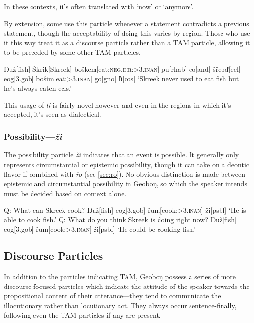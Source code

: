 \documentclass[10pt]{article}
\newcommand{\sk}{\textsc}
\newcommand{\vd}{ď}
\newcommand{\vz}{ž}
\newcommand{\vs}{š}
\newcommand{\vr}{ř}
\newcommand{\vl}{ľ}
\newcommand{\vS}{Š}
\newcommand{\Engma}{Ŋ}
\newcommand{\engma}{ŋ}
\begin{document}
In these contexts, it's often translated with `now' or `anymore'.

By extension, some use this particle whenever a statement contradicts a previous statement, though the acceptability of doing this varies by region. Those who use it this way treat it as a discourse particle rather than a TAM particle, allowing it to be preceded by some other TAM particles.

\ex {}
\begingl
\Engma u\vz[fish]
\vS krik[Skreek]
bo\vs kem[eat:\sk{neg.dir:>3.inan}]
pu[\sc rhab]
eo[and]
\vs\vr eo\vd[eel]
eog[\sc 3.gob]
bo\vs im[eat:\sk{>3.inan}]
go[\sc gno]
\vl i[\sc cos]
\glft `Skreek never used to eat fish but he's always eaten eels.'
\endgl
\xe

This usage of \textit{\vl i} is fairly novel however and even in the regions in which it's accepted, it's seen as dialectical.

\subsubsection{Possibility---\textit{\vz i}}

The possibility particle \textit{\vz i} indicates that an event is possible. It generally only represents circumstantial or epistemic possibility, though it can take on a deontic flavor if combined with \textit{\vr o} (see \ref{sec:ro}). No obvious distinction is made between epistemic and circumstantial possibility in Geobo{\engma}, so which the speaker intends must be decided based on context alone.

\pex 
\a
\begingl
\glpreamble
Q: What can Skreek cook?
\endpreamble
{}
\Engma u\vz[fish]
eog[\sc 3.gob]
\vr um[cook:\sk{>3.inan}]
\vz i[\sc psbl]
\glft \phantom{A: }`He is able to cook fish.'
\endgl
\a 
\begingl
\glpreamble
Q: What do you think Skreek is doing right now?
\endpreamble
{}
\Engma u\vz[fish]
eog[\sc 3.gob]
\vr um[cook:\sk{>3.inan}]
\vz i[\sc psbl]
\glft \phantom{A: }`He could be cooking fish.'
\endgl
\xe

\subsection{Discourse Particles}

In addition to the particles indicating TAM, Geobo{\engma} possess a series of more discourse-focused particles which indicate the attitude of the speaker towards the propositional content of their utterance---they tend to communicate the illocutionary rather than locutionary act. They always occur sentence-finally, following even the TAM particles if any are present.
\end{document}
